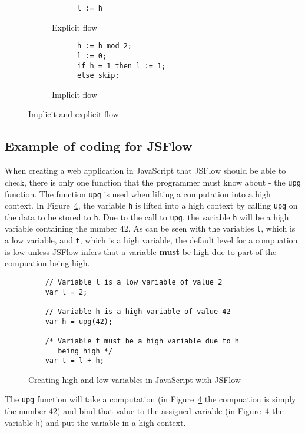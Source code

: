 \begin{figure}[h]
  \captionsetup[subfigure]{singlelinecheck=off,justification=raggedright}
  \begin{subfigure}[b]{0.5\textwidth}
    \begin{verbatim}
      l := h
    \end{verbatim}
    \caption{Explicit flow}
    \label{fig:expflow}
  \end{subfigure}
  \begin{subfigure}[b]{0.5\textwidth}
    \begin{verbatim}
      h := h mod 2;
      l := 0;
      if h = 1 then l := 1;
      else skip;
    \end{verbatim}
    \caption{Implicit flow}
    \label{fig:impflow}
  \end{subfigure}
  \caption{Implicit and explicit flow}
\end{figure}

\subsection{Example of coding for JSFlow}
When creating a web application in JavaScript that JSFlow should be able to check, there is only one function that the programmer must know about - the {\tt upg} function. The function {\tt upg} is used when lifting a computation into a high context. In Figure~\ref{fig:upg}, the variable {\tt h} is lifted into a high context by calling {\tt upg} on the data to be stored to {\tt h}. Due to the call to {\tt upg}, the variable {\tt h} will be a high variable containing the number 42. As can be seen with the variables {\tt l}, which is a low variable, and {\tt t}, which is a high variable, the default level for a compuation is low unless JSFlow infers that a variable \textbf{must} be high due to part of the compuation being high.

\begin{figure}[h]
  \begin{verbatim}
    // Variable l is a low variable of value 2
    var l = 2;

    // Variable h is a high variable of value 42
    var h = upg(42);

    /* Variable t must be a high variable due to h
       being high */
    var t = l + h;
  \end{verbatim}
  \caption{Creating high and low variables in JavaScript with JSFlow}
  \label{fig:upg}
\end{figure}
The {\tt upg} function will take a computation (in Figure~\ref{fig:upg} the compuation is simply the number 42) and bind that value to the assigned variable (in Figure~\ref{fig:upg} the variable {\tt h}) and put the variable in a high context.

